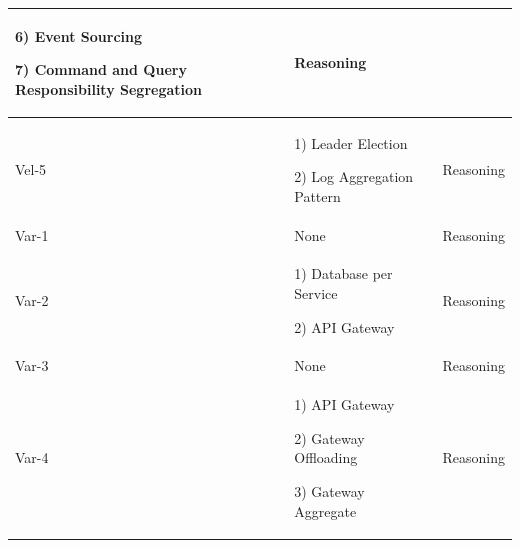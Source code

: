 \documentclass[conference]{IEEEtran}
\begin{document}
\begin{center}
\begin{table}
\begin{tabular}{ | m{2cm} | m{8cm} |  m{2cm} |}
        6) Event Sourcing

        7) Command and Query Responsibility Segregation

        & Reasoning
        
        \\
        \hline

        Vel-5 &  

        1) Leader Election 

        2) Log Aggregation Pattern 

        & Reasoning
        
        \\
        \hline

        
        Var-1 &  
        
        None

        & Reasoning
        
        \\
        \hline

        Var-2 &  
        
        1)  Database per Service

        2) API Gateway

        & Reasoning
        
        \\
        \hline

        Var-3 & None  & Reasoning
        
        \\
        \hline

        Var-4 &  

        1) API Gateway

        2) Gateway Offloading

        3) Gateway Aggregate
        
        & Reasoning
        
        \\
        \hline
  
    \end{tabular}
    \end{table}
\end{center}
\end{document}
